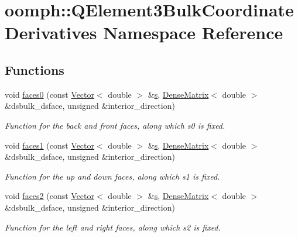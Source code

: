 \hypertarget{namespaceoomph_1_1QElement3BulkCoordinateDerivatives}{}\section{oomph\+:\+:Q\+Element3\+Bulk\+Coordinate\+Derivatives Namespace Reference}
\label{namespaceoomph_1_1QElement3BulkCoordinateDerivatives}
\subsection*{Functions}
\begin{DoxyCompactItemize}
\item 
void \hyperlink{namespaceoomph_1_1QElement3BulkCoordinateDerivatives_a5db40fd51122a966dc826e7c692a1218}{faces0} (const \hyperlink{classoomph_1_1Vector}{Vector}$<$ double $>$ \&\hyperlink{cfortran_8h_ab7123126e4885ef647dd9c6e3807a21c}{s}, \hyperlink{classoomph_1_1DenseMatrix}{Dense\+Matrix}$<$ double $>$ \&dsbulk\+\_\+dsface, unsigned \&interior\+\_\+direction)
\begin{DoxyCompactList}\small\item\em Function for the back and front faces, along which s0 is fixed. \end{DoxyCompactList}\item 
void \hyperlink{namespaceoomph_1_1QElement3BulkCoordinateDerivatives_a99b7b4ae34e0a5b95e9f8d7c3396f79a}{faces1} (const \hyperlink{classoomph_1_1Vector}{Vector}$<$ double $>$ \&\hyperlink{cfortran_8h_ab7123126e4885ef647dd9c6e3807a21c}{s}, \hyperlink{classoomph_1_1DenseMatrix}{Dense\+Matrix}$<$ double $>$ \&dsbulk\+\_\+dsface, unsigned \&interior\+\_\+direction)
\begin{DoxyCompactList}\small\item\em Function for the up and down faces, along which s1 is fixed. \end{DoxyCompactList}\item 
void \hyperlink{namespaceoomph_1_1QElement3BulkCoordinateDerivatives_a0026179a7406cf1f5cf254ad2b887172}{faces2} (const \hyperlink{classoomph_1_1Vector}{Vector}$<$ double $>$ \&\hyperlink{cfortran_8h_ab7123126e4885ef647dd9c6e3807a21c}{s}, \hyperlink{classoomph_1_1DenseMatrix}{Dense\+Matrix}$<$ double $>$ \&dsbulk\+\_\+dsface, unsigned \&interior\+\_\+direction)
\begin{DoxyCompactList}\small\item\em Function for the left and right faces, along which s2 is fixed. \end{DoxyCompactList}\end{DoxyCompactItemize}


